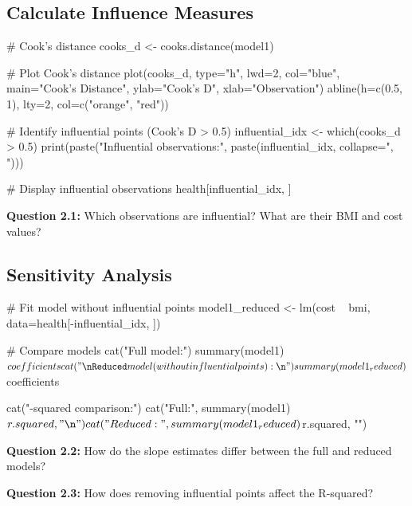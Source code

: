\documentclass[11pt]{article}
\begin{document}
\subsection{Calculate Influence Measures}

\begin{rcode}
# Cook's distance
cooks_d <- cooks.distance(model1)

# Plot Cook's distance
plot(cooks_d, type="h", lwd=2, col="blue",
     main="Cook's Distance",
     ylab="Cook's D", xlab="Observation")
abline(h=c(0.5, 1), lty=2, col=c("orange", "red"))

# Identify influential points (Cook's D > 0.5)
influential_idx <- which(cooks_d > 0.5)
print(paste("Influential observations:",
            paste(influential_idx, collapse=", ")))

# Display influential observations
health[influential_idx, ]
\end{rcode}

\textbf{Question 2.1:} Which observations are influential? What are their BMI and cost values?

\vspace{0.5cm}

\subsection{Sensitivity Analysis}

\begin{rcode}
# Fit model without influential points
model1_reduced <- lm(cost ~ bmi,
                     data=health[-influential_idx, ])

# Compare models
cat("Full model:\n")
summary(model1)$coefficients

cat("\nReduced model (without influential points):\n")
summary(model1_reduced)$coefficients

cat("\nR-squared comparison:\n")
cat("Full:", summary(model1)$r.squared, "\n")
cat("Reduced:", summary(model1_reduced)$r.squared, "\n")
\end{rcode}

\textbf{Question 2.2:} How do the slope estimates differ between the full and reduced models?

\vspace{0.5cm}

\textbf{Question 2.3:} How does removing influential points affect the R-squared?

\vspace{0.5cm}
\end{document}
